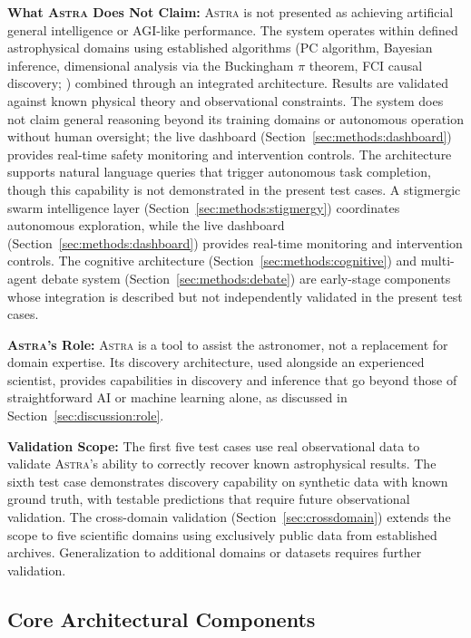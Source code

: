 \documentclass[usenatbib]{rasti}
\newcommand{\astra}{\textsc{Astra}\xspace}
\newcommand{\pc}{PC\xspace}
\newcommand{\fci}{FCI\xspace}
\begin{document}
\textbf{What \astra Does Not Claim:}
\astra is not presented as achieving artificial general intelligence or AGI-like performance.
The system operates within defined astrophysical domains using established algorithms (\pc algorithm, Bayesian inference, dimensional analysis via the Buckingham $\pi$ theorem, \fci causal discovery; \citealt{Zhang2008}) combined through an integrated architecture.
Results are validated against known physical theory and observational constraints.
The system does not claim general reasoning beyond its training domains or autonomous operation without human oversight; the live dashboard (Section~\ref{sec:methods:dashboard}) provides real-time safety monitoring and intervention controls.
The architecture supports natural language queries that trigger autonomous task completion, though this capability is not demonstrated in the present test cases.
A stigmergic swarm intelligence layer (Section~\ref{sec:methods:stigmergy}) coordinates autonomous exploration, while the live dashboard (Section~\ref{sec:methods:dashboard}) provides real-time monitoring and intervention controls.
The cognitive architecture (Section~\ref{sec:methods:cognitive}) and multi-agent debate system (Section~\ref{sec:methods:debate}) are early-stage components whose integration is described but not independently validated in the present test cases.

\textbf{\astra's Role:}
\astra is a tool to assist the astronomer, not a replacement for domain expertise.
Its discovery architecture, used alongside an experienced scientist, provides capabilities in discovery and inference that go beyond those of straightforward AI or machine learning alone, as discussed in Section~\ref{sec:discussion:role}.

\textbf{Validation Scope:}
The first five test cases use real observational data to validate \astra's ability to correctly recover known astrophysical results.
The sixth test case demonstrates discovery capability on synthetic data with known ground truth, with testable predictions that require future observational validation.
The cross-domain validation (Section~\ref{sec:crossdomain}) extends the scope to five scientific domains using exclusively public data from established archives.
Generalization to additional domains or datasets requires further validation.

\subsection{Core Architectural Components}
\label{sec:methods:components}
\end{document}
